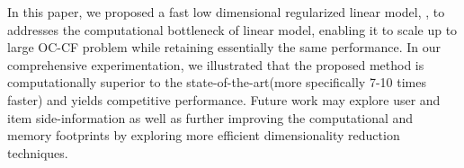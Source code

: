 
In this paper, we proposed a fast low dimensional regularized linear model, \LinearLow, to addresses the computational bottleneck of linear model, enabling it to scale up to large OC-CF problem while retaining essentially the same performance. In our comprehensive experimentation, we illustrated that the proposed method is computationally superior to the state-of-the-art(more specifically 7-10 times faster) and yields competitive performance. Future work may explore user and item side-information as well as further improving the computational and memory footprints by exploring more efficient dimensionality reduction techniques.
